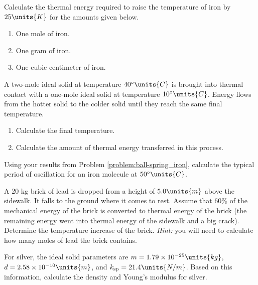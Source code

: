 \begin{problem} 
  Calculate the thermal energy required to raise the temperature of
  iron by $25\units{K}$ for the amounts given below.
\begin{enumerate}
\item One mole of iron.
\item One gram of iron.
\item One cubic centimeter of iron.
\end{enumerate}
\label{problem:mole_kg_cc}
\end{problem}


\begin{problem}
  A two-mole ideal solid at temperature $40^\circ\units{C}$ is
  brought into thermal contact with a one-mole ideal solid at
  temperature $10^\circ\units{C}$.  Energy flows from the hotter solid
  to the colder solid until they reach the same final temperature.
\begin{enumerate}
\item Calculate the final temperature.
\item Calculate the amount of thermal energy transferred in this process.
\end{enumerate}
\label{problem:calorimetry}
\end{problem}

\begin{problem}
  Using your results from Problem \ref{problem:ball-spring_iron},
  calculate the typical period of oscillation for an iron molecule
  at $50^\circ\units{C}$.
\label{problem:iron_oscillation}
\end{problem}

\begin{problem}
  A 20 kg brick of lead is dropped from a height of $5.0\units{m}$
  above the sidewalk.  It falls to the ground where it comes to rest.
  Assume that 60\% of the mechanical energy of the brick is converted
  to thermal energy of the brick (the remaining energy went into
  thermal energy of the sidewalk and a big crack).  Determine the
  temperature increase of the brick. {\it Hint:} you will need to
  calculate how many moles of lead the brick contains. 
\label{problem:falling_brick}
\end{problem}


\begin{problem}
  For silver, the ideal solid parameters are $m=1.79\times
  10^{-25}\units{kg}$, $d=2.58\times 10^{-10}\units{m}$, and
  $k_\text{sp}=21.4\units{N/m}$.  Based on this information, calculate the
  density and Young's modulus for silver.
\label{problem:silver_ball-spring}
\end{problem}

